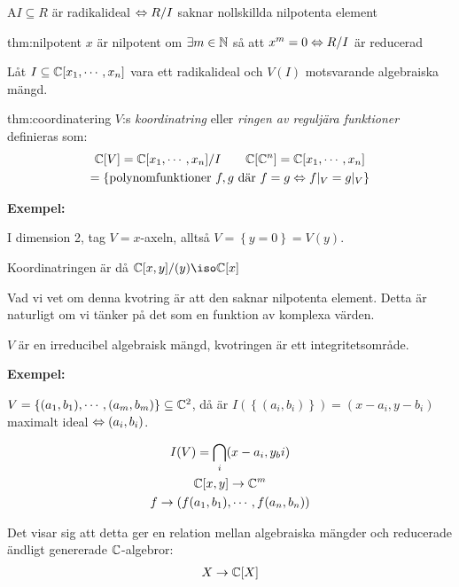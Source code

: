 \begin{theo}
  A$I\subseteq R$ är radikalideal $\Leftrightarrow R/I$ saknar nollskillda nilpotenta element
\end{theo}
\par\bigskip
\begin{theo}[Nilpotent]{thm:nilpotent}
  $x$ är nilpotent om $\exists m\in\mathbb{N}$ så att $x^m=0\Leftrightarrow R/I$ är reducerad 
\end{theo}
\par\bigskip
\noindent Låt $I\subseteq\mathbb{C}[x_1,\cdots,x_n]$ vara ett radikalideal och $V(I)$ motsvarande algebraiska mängd.
\par\bigskip
\begin{theo}[Koordinatringen]{thm:coordinatering}
  $V$:s \textit{koordinatring} eller \textit{ringen av reguljära funktioner} definieras som:
  \begin{equation*}
    \begin{gathered}
      \mathbb{C}[V] = \mathbb{C}[x_1,\cdots,x_n]/I\qquad\mathbb{C}[\mathbb{C}^n] = \mathbb{C}[x_1,\cdots,x_n]\\
      =\left\{\text{polynomfunktioner $f,g$ där $f=g\Leftrightarrow f|_V=g|_V$}\right\}
    \end{gathered}
  \end{equation*}
\end{theo}
\par\bigskip
\noindent\textbf{Exempel:}\par
\noindent I dimension 2, tag $V=x$-axeln, alltså $V = \left\{y=0\right\} = V(y)$.\par
\noindent Koordinatringen är då $\C[x,y]/(y) \iso\C[x]$\par
\noindent Vad vi vet om denna kvotring är att den saknar nilpotenta element. Detta är naturligt om vi tänker på det som en funktion av komplexa värden. \par
\noindent $V$ är en irreducibel algebraisk mängd, kvotringen är ett integritetsområde.
\par\bigskip
\noindent\textbf{Exempel:}\par
\noindent $V = \left\{(a_1,b_1),\cdots,(a_m,b_m)\right\}\subseteq\mathbb{C}^2$, då är $I(\left\{(a_i,b_i)\right\}) = (x-a_i,y-b_i)$ maximalt ideal $\Leftrightarrow (a_i,b_i)$.\par
\begin{equation*}
  \begin{gathered}
    I(V) = \bigcap_{i}(x-a_i,y_bi)\\
    \mathbb{C}[x,y]\to\mathbb{C}^m\\
    f\to (f(a_1,b_1),\cdots,f(a_n,b_n))
  \end{gathered}
\end{equation*}\par
\noindent Det visar sig att detta ger en relation mellan algebraiska mängder och reducerade ändligt genererade $\mathbb{C}$-algebror:
\begin{equation*}
  \begin{gathered}
    X\to\mathbb{C}[X]
  \end{gathered}
\end{equation*}
